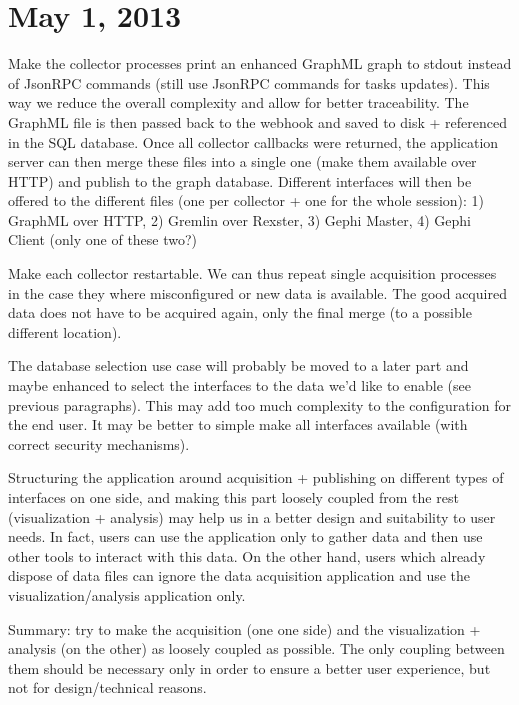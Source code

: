 
\section{May 1, 2013} 

Make the collector processes print an enhanced GraphML graph to stdout instead of JsonRPC commands (still use JsonRPC commands for tasks updates).
This way we reduce the overall complexity and allow for better traceability. The GraphML file is then passed back to the webhook and saved to disk + referenced in the SQL database. Once all collector callbacks were returned, the application server can then merge these files into a single one (make them available over HTTP) and publish to the graph database. Different interfaces will then be offered to the different files (one per collector + one for the whole session): 1) GraphML over HTTP, 2) Gremlin over Rexster, 3) Gephi Master, 4) Gephi Client (only one of these two?)

Make each collector restartable. We can thus repeat single acquisition processes in the case they where misconfigured or new data is available. The good acquired data does not have to be acquired again, only the final merge (to a possible different location).

The database selection use case will probably be moved to a later part and maybe enhanced to select the interfaces to the data we'd like to enable (see previous paragraphs). This may add too much complexity to the configuration for the end user. It may be better to simple make all interfaces available (with correct security mechanisms).

Structuring the application around acquisition + publishing on different types of interfaces on one side, and making this part loosely coupled from the rest (visualization + analysis) may help us in a better design and suitability to user needs. In fact, users can use the application only to gather data and then use other tools to interact with this data. On the other hand, users which already dispose of data files can ignore the data acquisition application and use the visualization/analysis application only.

Summary: try to make the acquisition (one one side) and the visualization + analysis (on the other) as loosely coupled as possible. The only coupling between them should be necessary only in order to ensure a better user experience, but not for design/technical reasons.

